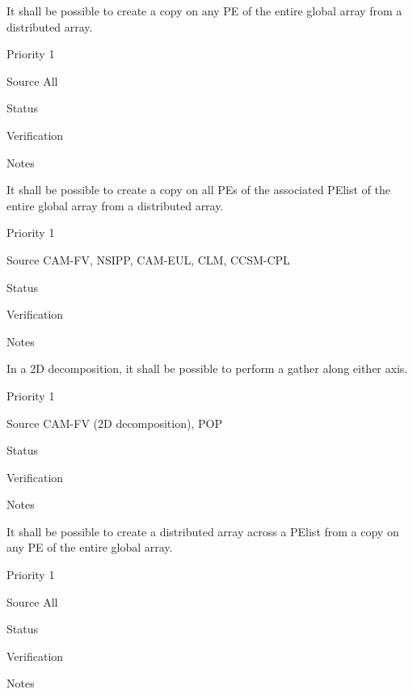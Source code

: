 
It shall be possible to create a copy on any PE of the entire global
array from a distributed array.

\begin{reqlist}
\item[Priority] 1
\item[Source] All
\item[Status]
\item[Verification]
\item[Notes] 
\end{reqlist}


It shall be possible to create a copy on all PEs of the associated
PElist of the entire global array from a distributed array.

\begin{reqlist}
\item[Priority] 1
\item[Source] CAM-FV, NSIPP, CAM-EUL, CLM, CCSM-CPL
\item[Status]
\item[Verification]
\item[Notes] 
\end{reqlist}

 \label{DG:PartGather}

In a 2D decomposition, it shall be possible to perform a gather along
either axis.

\begin{reqlist}
\item[Priority] 1
\item[Source] CAM-FV (2D decomposition), POP
\item[Status]
\item[Verification]
\item[Notes] 
\end{reqlist}


It shall be possible to create a distributed array across a PElist
from a copy on any PE of the entire global array.

\begin{reqlist}
\item[Priority] 1
\item[Source] All
\item[Status]
\item[Verification]
\item[Notes] 
\end{reqlist}

